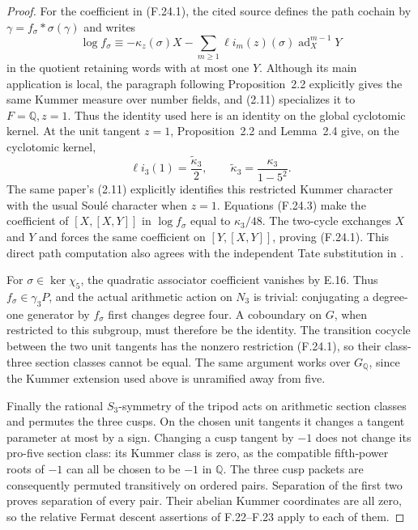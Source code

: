 \begin{proof}
For the coefficient in (F.24.1), the cited source
defines the path cochain by
\(\gamma=f_\sigma*\sigma(\gamma)\) and writes
\[
 \log f_\sigma\equiv-\kappa_z(\sigma)X
       -\sum_{m\geq1}\ell i_m(z)(\sigma)
                         \operatorname{ad}_X^{m-1}Y
\]
in the quotient retaining words with at most one \(Y\).
Although its main application is local, the paragraph
following Proposition~2.2 explicitly gives the same
Kummer measure over number fields, and (2.11)
specializes it to \(F=\mathbb Q,z=1\). Thus the
identity used here is an identity on the global
cyclotomic kernel.
At the unit tangent \(z=1\), Proposition~2.2 and
Lemma~2.4 give, on the cyclotomic kernel,
\[
 \ell i_3(1)=\frac{\widetilde\kappa_3}{2},
 \qquad
 \widetilde\kappa_3=\frac{\kappa_3}{1-5^2}.
                                                               \tag{F.24.3}
\]
The same paper's (2.11) explicitly identifies this
restricted Kummer character with the usual Soulé
character when \(z=1\). Equations (F.24.3) make the
coefficient of \([X,[X,Y]]\) in \(\log f_\sigma\)
equal to \(\kappa_3/48\).
The two-cycle exchanges \(X\) and \(Y\) and forces
the same coefficient on \([Y,[X,Y]]\), proving
(F.24.1). This direct path computation also agrees
with the independent Tate substitution in
\citet[Theorems~5.2.4--5.2.6]{Nakamura2013Eisenstein}.

For \(\sigma\in\ker\chi_5\), the quadratic associator
coefficient vanishes by E.16. Thus \(f_\sigma\in\gamma_3P\),
and the actual arithmetic action on \(N_3\) is trivial:
conjugating a degree-one generator by \(f_\sigma\)
first changes degree four. A coboundary on \(G\),
when restricted to this subgroup, must therefore
be the identity. The transition cocycle between the
two unit tangents has the nonzero restriction
(F.24.1), so their class-three section classes
cannot be equal. The same argument works over
\(G_{\mathbb Q}\), since the Kummer extension used
above is unramified away from five.

Finally the rational \(S_3\)-symmetry of the tripod
acts on arithmetic section classes and permutes the
three cusps. On the chosen unit tangents it changes
a tangent parameter at most by a sign.
Changing a cusp tangent by \(-1\) does not change its
pro-five section class: its Kummer class is zero,
as the compatible fifth-power roots of \(-1\)
can all be chosen to be \(-1\) in \(\mathbb Q\).
The three cusp packets are consequently permuted
transitively on ordered pairs. Separation of the
first two proves separation of every pair.
Their abelian Kummer coordinates are all zero, so
the relative Fermat descent assertions of F.22--F.23
apply to each of them.


\end{proof}

